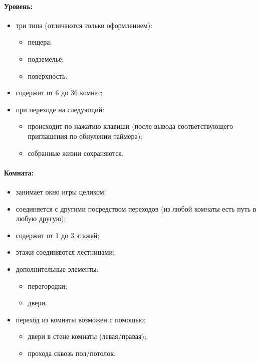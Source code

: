 \documentclass[12pt,a4paper,fullpage,titlepage]{article}
\begin{document}
\paragraph{Уровень:}
\begin{itemize}
	\item три типа (отличаются только оформлением):
	\begin{itemize}
		\item пещера;
		\item подземелье;
		\item поверхность.
	\end{itemize}
	\item содержит от 6 до 36 комнат;
	\item при переходе на следующий:
	\begin{itemize}
		\item происходит по нажатию клавиши (после вывода соответствующего приглашения по обнулении таймера);
		\item собранные жизни сохраняются.
	\end{itemize}
\end{itemize}

\paragraph{Комната:}
\begin{itemize}
	\item занимает окно игры целиком;
	\item соединяется с другими посредством переходов (из любой комнаты есть путь в любую другую);
	\item содержит от 1 до 3 этажей;
	\item этажи соединяются лестницами;
	\item дополнительные элементы:
	\begin{itemize}
		\item перегородки;
		\item двери.
	\end{itemize}
	\item переход из комнаты возможен с помощью:
	\begin{itemize}
		\item двери в стене комнаты (левая/правая);
		\item прохода сквозь пол/потолок.
	\end{itemize}
\end{itemize}
\end{document}
